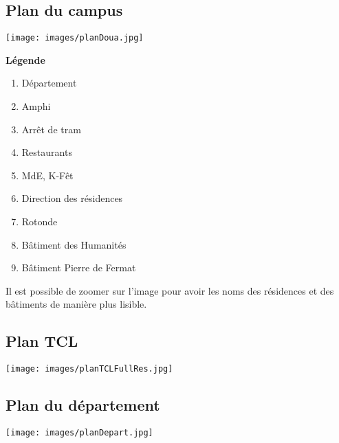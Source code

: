 \subsection{Plan du campus}
\begin{minipage}{0.7\textwidth}
\texttt{[image: images/planDoua.jpg]}
\end{minipage}
\begin{minipage}{0.3\textwidth}
\textbf{Légende}
    \begin{enumerate}
	\item Département
	\item Amphi
	\item Arrêt de tram
	\item Restaurants
	\item MdE, K-Fêt
	\item Direction des résidences
	\item Rotonde
	\item Bâtiment des Humanités
	\item Bâtiment Pierre de Fermat
    \end{enumerate}
   \vspace{2cm} 
    Il est possible de zoomer sur l'image pour avoir les noms des résidences et
    des bâtiments de manière plus lisible.
\end{minipage}
\newpage

\subsection{Plan TCL}
\hspace{-2cm}
\texttt{[image: images/planTCLFullRes.jpg]}

\newpage 
\subsection{Plan du département}
\begin{center}
\texttt{[image: images/planDepart.jpg]}
\end{center}

